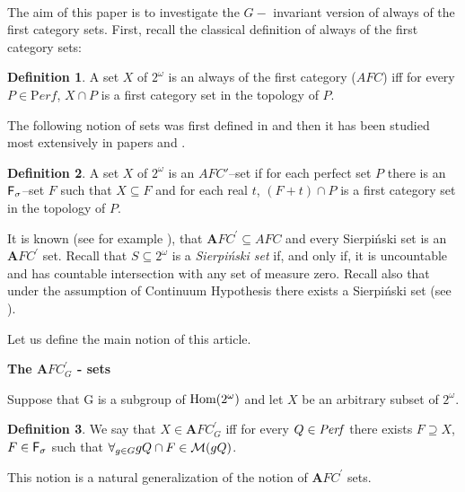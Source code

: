\documentclass[b5cutpaper, twoside, 11pt, leqno]{moravica}
\newcommand{\afcp}{{\mathbf AFC}^\prime}
\newcommand\afcg{\afcp_{G}}
\newcommand{\seq}{\subseteq}
\newcommand{\ca}{2^{\omega}}
\newcommand{\afc}{AFC}
\newcommand{\mgr}{{\cal M}}
\newcommand{\perf}{{\it Perf}}
\newcommand{\fsigma}{{\sf F}_{\sigma}}
\newcommand{\cantor}{\ca}
\newcommand{\Perf}{{\mathrm Perf}}
\newcommand\Hom{{\rm Hom(\ca)}}
\theoremstyle{definition}
\newtheorem{definition}{Definition}[section]
\begin{document}
\bigskip
{} \\
\bigskip

The aim of this paper is to investigate the $G-$ invariant
version of always of the first category sets.
First, recall the classical definition of always of the first category sets:
\begin{definition}
A set $X$ of $\cantor$ is an always of the first category ($\afc$) 
iff for every $P\in \Perf$, $X\cap P$ is a first category set
in the topology of $P$.
\end{definition}

The following notion of sets was first defined in \cite{NSW}
and then it has been studied most extensively in
papers \cite{NW1} and \cite{NW2}.

\begin{definition}
  A set $X$ of $\cantor$ is an $\afc'$--set if for each perfect
set $P$ there is an $\fsigma$--set $F$ such that $X\subseteq F$
and for each real $t$, $(F + t)\cap P$ is a first
category set in the topology of $P$.
\end{definition}


It is known (see for example \cite{NSW}),
that $\afcp \seq \afc$ and every Sierpi\'nski set is an $\afcp$ set.
Recall that $S \subseteq \cantor$ is a {\it Sierpi\'nski set}
if, and only if, it is uncountable and has countable intersection with
any set of measure zero. Recall also that under the assumption
of Continuum Hypothesis there exists a Sierpi\'nski set (see \cite{Si}).

Let us define the main notion of this article.

\bigskip

{\bf The $\afcg$ - sets}


Suppose that G is a subgroup of $\Hom$
and let $X$ be an arbitrary subset of $\ca$.

\begin{definition}
\label{afcg}
We say that $X \in \afcg$ iff
for every $Q \in \perf$ there
exists $F \supseteq X$, $F\in \fsigma$
such that
$\forall_{g\in G} gQ \cap F \in \mgr(gQ)$.
\end{definition}

  This notion is a natural generalization
of the notion of $\afcp$ sets.
\end{document}
